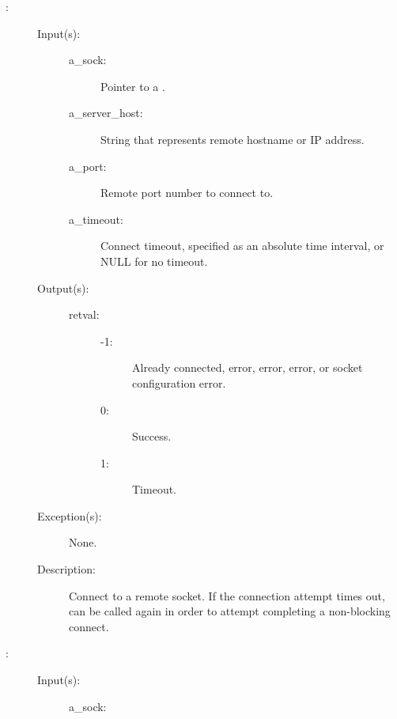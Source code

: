 \begin{description}
\item[{}: ]
	\begin{description}\item[]
	\item[Input(s): ]
		\begin{description}\item[]
		\item[a\_sock: ]
			Pointer to a .
		\item[a\_server\_host: ]
			String that represents remote hostname or IP address.
		\item[a\_port: ]
			Remote port number to connect to.
		\item[a\_timeout: ]
			Connect timeout, specified as an absolute time interval,
			or NULL for no timeout.
		\end{description}
	\item[Output(s): ]
		\begin{description}\item[]
		\item[retval: ]
			\begin{description}\item[]
			\item[-1: ]
				Already connected,  error,
				 error,  error,
				or socket configuration error.
			\item[0: ]
				Success.
			\item[1: ]
				Timeout.
			\end{description}
		\end{description}
	\item[Exception(s): ] None.
	\item[Description: ]
		Connect to a remote socket.  If the connection attempt times
		out,  can be called again in order to
		attempt completing a non-blocking connect.
	\end{description}
\label{sock_wrap}
\item[{}: ]
	\begin{description}\item[]
	\item[Input(s): ]
		\begin{description}\item[]
		\item[a\_sock: ]

\end{description}
\end{description}
\end{description}
